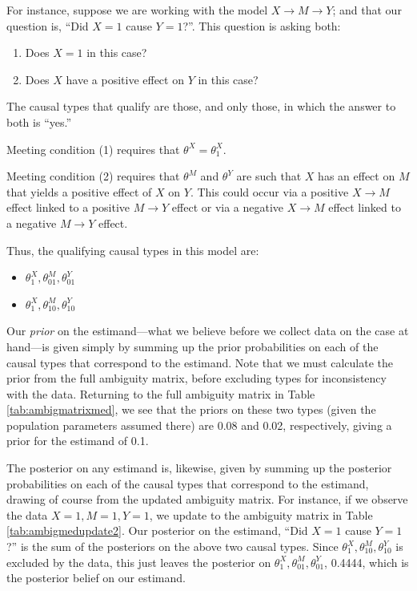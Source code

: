 \documentclass[
  12pt,
]{book}
\providecommand{\tightlist}{%
  \setlength{\itemsep}{0pt}\setlength{\parskip}{0pt}}
\begin{document}
For instance, suppose we are working with the model \(X \rightarrow M \rightarrow Y\); and that our question is, ``Did \(X=1\) cause \(Y=1\)?''. This question is asking both:

\begin{enumerate}
\def\labelenumi{\arabic{enumi}.}
\item
  Does \(X=1\) in this case?
\item
  Does \(X\) have a positive effect on \(Y\) in this case?
\end{enumerate}

The causal types that qualify are those, and only those, in which the answer to both is ``yes.''

Meeting condition (1) requires that \(\theta^X=\theta^X_1\).

Meeting condition (2) requires that \(\theta^M\) and \(\theta^Y\) are such that \(X\) has an effect on \(M\) that yields a positive effect of \(X\) on \(Y\). This could occur via a positive \(X \rightarrow M\) effect linked to a positive \(M \rightarrow Y\) effect or via a negative \(X \rightarrow M\) effect linked to a negative \(M \rightarrow Y\) effect.

Thus, the qualifying causal types in this model are:

\begin{itemize}
\tightlist
\item
  \(\theta^X_1, \theta^M_{01}, \theta^Y_{01}\)
\item
  \(\theta^X_1, \theta^M_{10}, \theta^Y_{10}\)
\end{itemize}

Our \emph{prior} on the estimand---what we believe before we collect data on the case at hand---is given simply by summing up the prior probabilities on each of the causal types that correspond to the estimand. Note that we must calculate the prior from the full ambiguity matrix, before excluding types for inconsistency with the data. Returning to the full ambiguity matrix in Table \ref{tab:ambigmatrixmed}, we see that the priors on these two types (given the population parameters assumed there) are 0.08 and 0.02, respectively, giving a prior for the estimand of 0.1.

The posterior on any estimand is, likewise, given by summing up the posterior probabilities on each of the causal types that correspond to the estimand, drawing of course from the updated ambiguity matrix. For instance, if we observe the data \(X=1, M=1, Y=1\), we update to the ambiguity matrix in Table \ref{tab:ambigmedupdate2}. Our posterior on the estimand, ``Did \(X=1\) cause \(Y=1\)?'' is the sum of the posteriors on the above two causal types. Since \(\theta^X_1, \theta^M_{10}, \theta^Y_{10}\) is excluded by the data, this just leaves the posterior on \(\theta^X_1, \theta^M_{01}, \theta^Y_{01}\), 0.4444, which is the posterior belief on our estimand.
\end{document}

